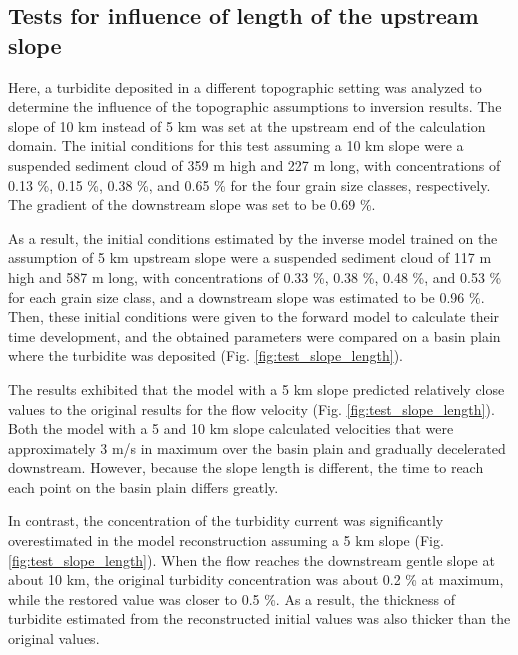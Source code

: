 \subsection{Tests for influence of length of the upstream slope}
Here, a turbidite deposited in a different topographic setting was analyzed to determine the influence of the topographic assumptions to inversion results. The slope of 10 km instead of 5 km was set at the upstream end of the calculation domain. The initial conditions for this test assuming a 10 km slope were a suspended sediment cloud of 359 m high and 227 m long, with concentrations of 0.13 \%, 0.15 \%, 0.38 \%, and 0.65 \% for the four grain size classes, respectively. The gradient of the downstream slope was set to be 0.69 \%.

As a result, the initial conditions estimated by the inverse model trained on the assumption of 5 km upstream slope were a suspended sediment cloud of 117 m high and 587 m long, with concentrations of 0.33 \%, 0.38 \%, 0.48 \%, and 0.53 \% for each grain size class, and a downstream slope was estimated to be 0.96 \%. Then, these initial conditions were given to the forward model to calculate their time development, and the obtained parameters were compared on a basin plain where the turbidite was deposited (Fig. \ref{fig:test_slope_length}).

The results exhibited that the model with a 5 km slope predicted relatively close values to the original results for the flow velocity (Fig. \ref{fig:test_slope_length}). Both the model with a 5 and 10 km slope calculated velocities that were approximately 3 m/s in maximum over the basin plain and gradually decelerated downstream. However, because the slope length is different, the time to reach each point on the basin plain differs greatly.

In contrast, the concentration of the turbidity current was significantly overestimated in the model reconstruction assuming a 5 km slope (Fig. \ref{fig:test_slope_length}). When the flow reaches the downstream gentle slope at about 10 km, the original turbidity concentration was about 0.2 \% at maximum, while the restored value was closer to 0.5 \%. As a result, the thickness of turbidite estimated from the reconstructed initial values was also thicker than the original values.

